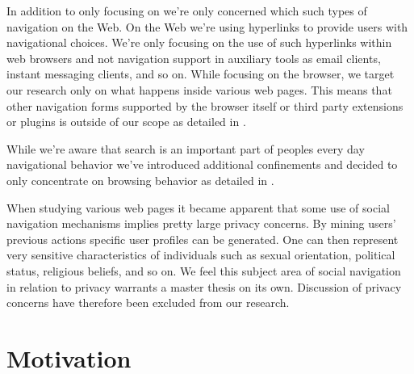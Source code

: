 In addition to only focusing on  we're only concerned
which such types of navigation on the Web.
On the Web we're using hyperlinks \citep[]{nelson65} to provide users
with navigational choices. We're only focusing on the use of such hyperlinks
within web browsers and not navigation support in auxiliary tools as email
clients, instant messaging clients, and so on. While focusing on the browser,
we target our research only on what happens inside various web pages. This
means that other navigation forms supported by the browser itself or third
party extensions or plugins is outside of our scope as detailed in
.

\placeBlogSideTable

While we're aware that search is an important part of peoples every day
navigational behavior we've introduced additional confinements and decided to
only concentrate on browsing behavior as detailed in
.

When studying various web pages it became apparent that some use of
social navigation mechanisms implies pretty large privacy concerns. By mining
users' previous actions specific user profiles can be generated. One can then
represent very sensitive characteristics of individuals such as sexual
orientation, political status, religious beliefs, and so on.
We feel this subject area of social navigation in relation to privacy warrants
a master thesis on its own. Discussion of privacy concerns have therefore
been excluded from our research.


\section{Motivation}

